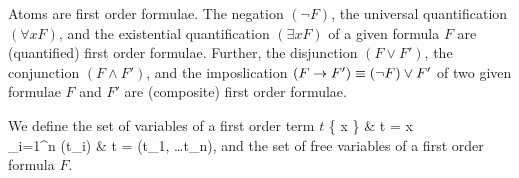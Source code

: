 
\begin{definition}[\FOF]\label{def:syntax:FOF}
	Atoms are {\myem first order formulae}. 
	The negation $(\lnot F)$, 
	the universal quantification $(\forall x F)$, 
	and the existential quantification $(\exists x F)$ 
	of a given formula $F$ are (quantified) first order formulae.
	Further, the disjunction $(F \lor F')$, 
	the conjunction $(F \land F') $, 
	and the imposlication $(F \rightarrow F') \equiv (\lnot F) \lor F'$ 
	of two given formulae $F$ and $F'$ 
	are (composite) first order formulae.
\end{definition}

\begin{definition}We define the set of variables of a first order term $t$
	 {
		\{ x \} &  t = x \in \mcV \\
		\bigcup_{i=1}^n \var(t_i) &   t = \mf(t_1, \ldots t_n), \mf \in \mcFfn
	}
and the set of {\myem free} variables of a first order formula $F$.
\end{definition}